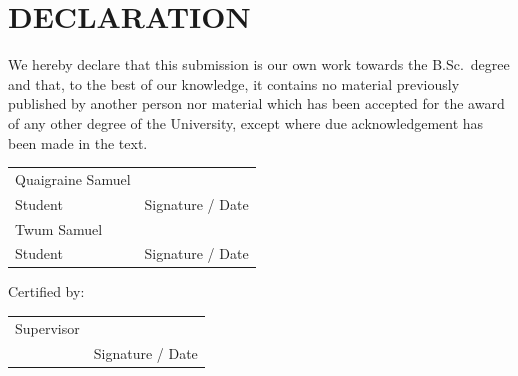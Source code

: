 \chapter*{DECLARATION}

We hereby declare that this submission is our own work towards the B.Sc.\ degree and that, to the best of our knowledge, it contains no material previously published by another person nor material which has been accepted for the award of any other degree of the University, except where due acknowledgement has been made in the text.

\vspace{1.5cm}
\begin{tabular}{@{}p{7cm}p{5cm}@{}}
Quaigraine Samuel & \underline{\hspace{4cm}} \\
Student & Signature / Date \\[1.2cm]
Twum Samuel & \underline{\hspace{4cm}} \\
Student & Signature / Date \\
\end{tabular}

\vspace{1.5cm}
Certified by:\\[0.8cm]
\begin{tabular}{@{}p{7cm}p{5cm}@{}}
Supervisor & \underline{\hspace{4cm}} \\
 & Signature / Date \\
\end{tabular}
